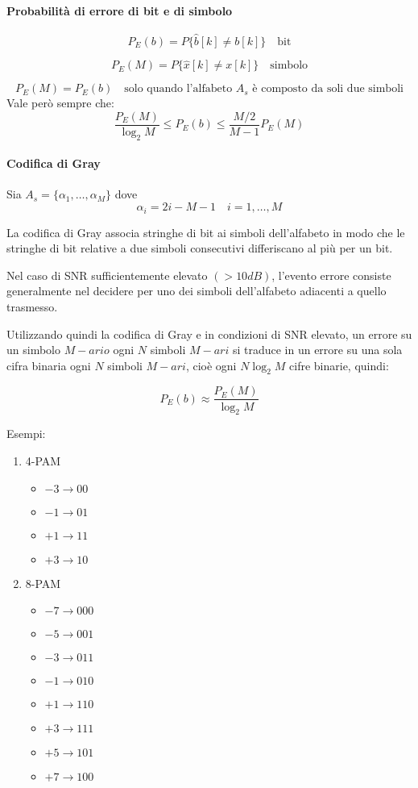 \paragraph{Probabilità di errore di bit e di simbolo}

\[
P_E(b) = P\{\hat{b}[k] \neq b[k]\} \quad \text{bit}
\]

\[
P_E(M) = P\{\hat{x}[k] \neq x[k]\} \quad \text{simbolo}
\]

\[
P_E(M) = P_E(b) \quad \text{solo quando l'alfabeto } A_s \text{ è composto da soli due simboli}
\]
Vale però sempre che:
\[
\frac{P_E(M)}{\log_2 M} \leq P_E(b) \leq \frac{M/2}{M-1} P_E(M)
\]

\paragraph{Codifica di Gray}

Sia \( A_s = \{\alpha_1, \ldots, \alpha_M\} \) dove
\[ 
\alpha_i = 2i - M - 1 \quad i = 1, \ldots, M
\]

La codifica di Gray associa stringhe di bit ai simboli dell'alfabeto in modo che le stringhe di bit relative a due simboli consecutivi differiscano al più per un bit.

Nel caso di SNR sufficientemente elevato \( (> 10 dB) \), l'evento errore consiste generalmente nel decidere per uno dei simboli dell'alfabeto adiacenti a quello trasmesso.

Utilizzando quindi la codifica di Gray e in condizioni di SNR elevato, un errore su un simbolo \( M-ario \) ogni \( N \) simboli  \( M-ari \) si traduce in un errore su una sola cifra binaria ogni \( N \) simboli \( M-ari \), cioè ogni \( N \log_2 M \) cifre binarie, quindi:

\[
P_E(b) \approx \frac{P_E(M)}{\log_2 M}
\]


Esempi:

\begin{enumerate}
    \item 4-PAM
    \begin{itemize}
        \item $-3 \rightarrow 00$
        \item $-1 \rightarrow 01$
        \item $+1 \rightarrow 11$
        \item $+3 \rightarrow 10$
    \end{itemize}

    \item 8-PAM
    \begin{itemize}
        \item $-7 \rightarrow 000$
        \item $-5 \rightarrow 001$
        \item $-3 \rightarrow 011$
        \item $-1 \rightarrow 010$
        \item $+1 \rightarrow 110$
        \item $+3 \rightarrow 111$
        \item $+5 \rightarrow 101$
        \item $+7 \rightarrow 100$
    \end{itemize}
\end{enumerate}
